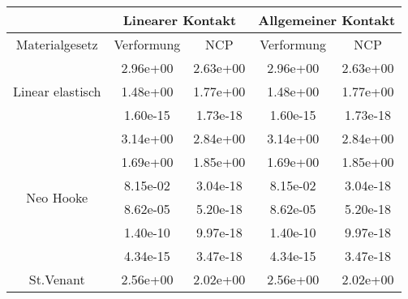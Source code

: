 \begin{table} 
\centering 
\begin{tabular}{c|cc|cc|} 
\cline{2-5} 
 & \multicolumn{2}{|c|}{Linearer Kontakt} & \multicolumn{2}{|c|}{Allgemeiner Kontakt} \\ 
\hline 
\multicolumn{1}{|c|}{Materialgesetz} & \multicolumn{1}{c|}{Verformung} & \multicolumn{1}{c|}{NCP} & \multicolumn{1}{c|}{Verformung} & \multicolumn{1}{c|}{NCP} \\ 
\hline 
\multicolumn{1}{|c|}{\multirow{3}{*}{Linear elastisch}} &\multicolumn{1}{|c|}{  2.96e+00} & \multicolumn{1}{|c|}{  2.63e+00} & \multicolumn{1}{|c|}{  2.96e+00} & \multicolumn{1}{|c|}{  2.63e+00} \\ 
\multicolumn{1}{|c|}{} & \multicolumn{1}{|c|}{  1.48e+00} & \multicolumn{1}{|c|}{  1.77e+00} & \multicolumn{1}{|c|}{  1.48e+00} & \multicolumn{1}{|c|}{  1.77e+00} \\ 
\multicolumn{1}{|c|}{} & \multicolumn{1}{|c|}{  1.60e-15} & \multicolumn{1}{|c|}{  1.73e-18} & \multicolumn{1}{|c|}{  1.60e-15} & \multicolumn{1}{|c|}{  1.73e-18} \\ 
\hline 
\multicolumn{1}{|c|}{\multirow{6}{*}{Neo Hooke}} &\multicolumn{1}{|c|}{  3.14e+00} & \multicolumn{1}{|c|}{  2.84e+00} & \multicolumn{1}{|c|}{  3.14e+00} & \multicolumn{1}{|c|}{  2.84e+00} \\ 
\multicolumn{1}{|c|}{} & \multicolumn{1}{|c|}{  1.69e+00} & \multicolumn{1}{|c|}{  1.85e+00} & \multicolumn{1}{|c|}{  1.69e+00} & \multicolumn{1}{|c|}{  1.85e+00} \\ 
\multicolumn{1}{|c|}{} & \multicolumn{1}{|c|}{  8.15e-02} & \multicolumn{1}{|c|}{  3.04e-18} & \multicolumn{1}{|c|}{  8.15e-02} & \multicolumn{1}{|c|}{  3.04e-18} \\ 
\multicolumn{1}{|c|}{} & \multicolumn{1}{|c|}{  8.62e-05} & \multicolumn{1}{|c|}{  5.20e-18} & \multicolumn{1}{|c|}{  8.62e-05} & \multicolumn{1}{|c|}{  5.20e-18} \\ 
\multicolumn{1}{|c|}{} & \multicolumn{1}{|c|}{  1.40e-10} & \multicolumn{1}{|c|}{  9.97e-18} & \multicolumn{1}{|c|}{  1.40e-10} & \multicolumn{1}{|c|}{  9.97e-18} \\ 
\multicolumn{1}{|c|}{} & \multicolumn{1}{|c|}{  4.34e-15} & \multicolumn{1}{|c|}{  3.47e-18} & \multicolumn{1}{|c|}{  4.34e-15} & \multicolumn{1}{|c|}{  3.47e-18} \\ 
\hline 
\multicolumn{1}{|c|}{\multirow{6}{*}{St.Venant}} &\multicolumn{1}{|c|}{  2.56e+00} & \multicolumn{1}{|c|}{  2.02e+00} & \multicolumn{1}{|c|}{  2.56e+00} & \multicolumn{1}{|c|}{  2.02e+00} \\ 

\end{tabular}
\end{table}
